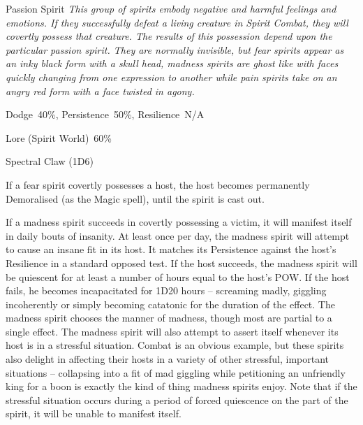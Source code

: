 \begin{monsterbox}{Passion Spirit}
	\textit{This group of spirits embody negative and harmful feelings and emotions. If they successfully defeat a living creature in Spirit Combat, they will covertly possess that creature. The results of this possession depend upon the particular passion spirit. They are normally invisible, but fear spirits appear as an inky black form with a skull head, madness spirits are ghost like with faces quickly changing from one expression to another while pain spirits take on an angry red form with a face twisted in agony.}\\
	\rpghline
	\basics[%
	powerpoints = 17,
	movementrate = 30m,
	plunderrating = 0
	]
	\rpghline%
	\stats[ %
		STR = -,
		CON = -,
		DEX = -,
		SIZ = -,
		INT = 2D6+3  (10),
		POW = 3D6+6  (17),
		CHA = 4D6    (14)
	]
	\rpghline%
	\begin{rpg-monsteraction}[Resistances]
		Dodge~40\%, Persistence~50\%, Resilience~N/A
	\end{rpg-monsteraction}
	\begin{rpg-monsteraction}[Knowledge]
		Lore (Spirit World)~60\%
	\end{rpg-monsteraction}
	\begin{rpg-monsteraction}
		Spectral Claw (1D6)
	\end{rpg-monsteraction}
	\begin{rpg-monsteraction}
		If a fear spirit covertly possesses a host, the host becomes permanently Demoralised (as the Magic spell), until the spirit is cast out.
	\end{rpg-monsteraction}
	\begin{rpg-monsteraction}
		If a madness spirit succeeds in covertly possessing a victim, it will manifest itself in daily bouts of insanity. At least once per day, the madness spirit will attempt to cause an insane fit in its host. It matches its Persistence against the host’s Resilience in a standard opposed test. If the host succeeds, the madness spirit will be quiescent for at least a number of hours equal to the host’s POW. If the host fails, he becomes incapacitated for 1D20 hours – screaming madly, giggling incoherently or simply becoming catatonic for the duration of the effect. The madness spirit chooses the manner of madness, though most are partial to a single effect. The madness spirit will also attempt to assert itself whenever its host is in a stressful situation. Combat is an obvious example, but these spirits also delight in affecting their hosts in a variety of other stressful, important situations – collapsing into a fit of mad giggling while petitioning an unfriendly king for a boon is exactly the kind of thing madness spirits enjoy. Note that if the stressful situation occurs during a period of forced quiescence on the part of the spirit, it will be unable to manifest itself.

\end{rpg-monsteraction}
\end{monsterbox}
